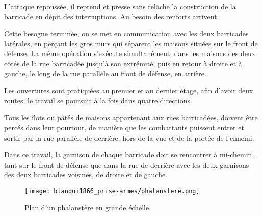 \documentclass[french,twoside]{book} %
\begin{document}
L'attaque repoussée, il reprend et presse sans relâche la construction de la barricade en dépit des interruptions. Au besoin des renforts arrivent.\par
Cette besogne terminée, on se met en communication avec les deux barricades latérales, en perçant les gros murs qui séparent les maisons situées sur le front de défense. La même opération s’exécute simultanément, dans les maisons des deux côtés de la rue barricadée jusqu’à son extrémité, puis en retour à droite et à gauche, le long de la rue parallèle au front de défense, en arrière.\par
Les ouvertures sont pratiquées au premier et au dernier étage, afin d’avoir deux routes; le travail se poursuit à la fois dans quatre directions.\par
Tous les îlots ou pâtés de maisons appartenant aux rues barricadées, doivent être percés dans leur pourtour, de manière que les combattants puissent entrer et sortir par la rue parallèle de derrière, hors de la vue et de la portée de l’ennemi.\par
Dans ce travail, la garnison de chaque barricade doit se rencontrer à mi-chemin, tant sur le front de défense que dans la rue de derrière avec les deux garnisons des deux barricades voisines, de droite et de gauche.\par

\begin{figure}[h]
  \centering
  \texttt{[image: blanqui1866\_prise-armes/phalanstere.png]}
\caption{Plan d’un phalanstère en grande échelle}
\end{figure}
\end{document}
